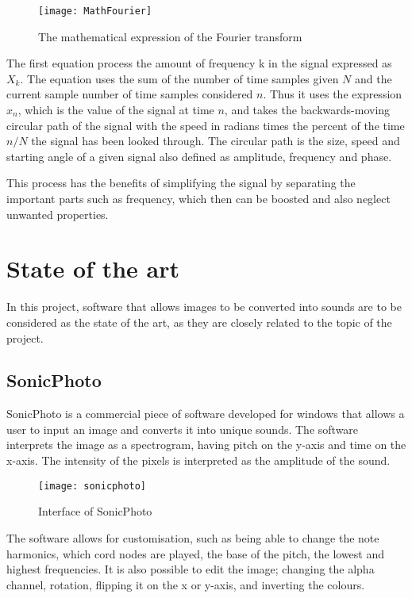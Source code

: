 \begin{figure}
\caption{The mathematical expression of the Fourier transform}
\centering
\texttt{[image: MathFourier]}
\end{figure}

The first equation process the amount of frequency k in the signal expressed as \(X_k\). The equation uses the sum of the number of time samples given \(N\) and the current sample number of time samples considered \(n\). Thus it uses the expression \(x_n\), which is the value of the signal at time \(n\), and takes  the backwards-moving circular path of the signal with the speed in radians times the percent of the time \(n/N\) the signal has been looked through. The circular path is the size, speed and starting angle of a given signal also defined as amplitude, frequency and phase.      

This process has the benefits of simplifying the signal by separating the important parts such as frequency, which then can be boosted and also neglect unwanted properties.       

\section{State of the art}\label{sec:stateart}
In this project, software that allows images to be converted into sounds are to be considered as the state of the art, as they are closely related to the topic of the project.

\subsection{SonicPhoto}\label{sub:sonic}
SonicPhoto \cite{White2013} is a commercial piece of software developed for windows that allows a user to input an image and converts it into unique sounds. The software interprets the image as a spectrogram, having pitch on the y-axis and time on the x-axis. The intensity of the pixels is interpreted as the amplitude of the sound. 

\begin{figure}[!h] 
\centering
\texttt{[image: sonicphoto]}
\caption{\label{fig:sonicphoto} Interface of SonicPhoto \cite{White2013}}
\end{figure}

The software allows for customisation, such as being able to change the note harmonics, which cord nodes are played, the base of the pitch, the lowest and highest frequencies. It is also possible to edit the image; changing the alpha channel, rotation, flipping it on the x or y-axis, and inverting the colours. 

